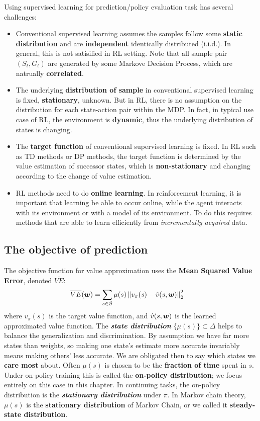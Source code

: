 \documentclass[11pt]{article}
\begin{document}
Using supervised learning for prediction/policy evaluation task has several challenges:
\begin{itemize}
\item Conventional supervised learning assumes the samples follow some \textbf{static distribution} and are \textbf{independent} identically distributed (i.i.d.). In general, this is not satisified in RL setting. Note that all sample pair $(S_{t}, G_{t})$ are generated by some Markove Decision Process, which are natrually \textbf{correlated}. 

\item The underlying \textbf{distribution of sample} in conventional supervised learning is fixed, \textbf{stationary}, unknown. But in RL, there is no assumption on the distribution for each state-action pair within the MDP. In fact, in typical use case of RL, the environment is \textbf{dynamic}, thus the underlying distribution of states is changing.

\item The \textbf{target function} of conventional supervised learning is  fixed. In RL such as TD methods or DP methods, the target function is determined by the value estimation of successor states, which is \textbf{non-stationary} and changing according to the change of value estimation.

\item RL methods need to do \textbf{online learning}.  In reinforcement learning, it is important that learning be able to occur online, while the agent
interacts with its environment or with a model of its environment. To do this requires methods that are able to learn efficiently from \emph{incrementally acquired} data.
\end{itemize}

\subsection{The objective of prediction}
The objective function for value approximation uses the \textbf{Mean Squared Value Error}, denoted $\overline{VE}$:
\begin{align*}
\overline{VE}(\boldsymbol{w}) &= \sum_{s \in {\mathcal S}}\mu(s)\left\|v_{\pi}(s) - \hat{v}(s, \boldsymbol{w})\right\|_{2}^{2}
\end{align*} where $v_{\pi}(s)$ is the target value function, and $\hat{v}(s, \boldsymbol{w})$ is the learned approximated value function. The \textbf{\emph{state distribution}} $\{\mu(s)\} \subset \Delta$ helps to balance the generalization and discrimination. By assumption we have far more states than weights, so making one state’s estimate more accurate invariably means making others’ less accurate. We are obligated then to say which states we \textbf{care most} about. Often $\mu(s)$ is chosen to be the \textbf{fraction of time} spent in $s$. Under on-policy training this is called the \textbf{on-policy distribution}; we focus entirely on this case in this chapter. In continuing tasks,
the on-policy distribution is the \textbf{\emph{stationary distribution}} under $\pi$. In Markov chain theory, $\mu(s)$ is the \textbf{stationary distribution} of Markov Chain, or we called it \textbf{steady-state distribution}.
\end{document}
